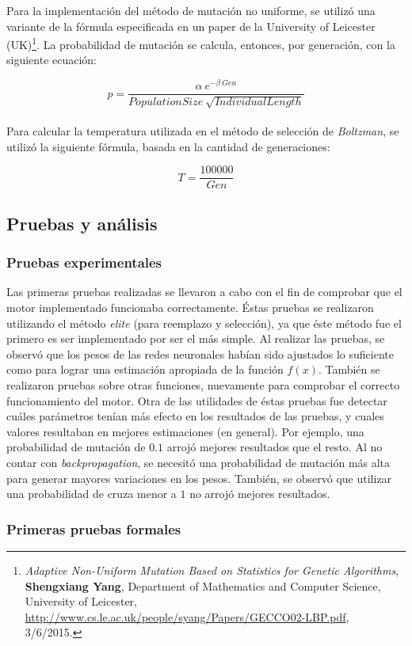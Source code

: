 \documentclass[11pt,a4paper]{article}
\begin{document}
Para la implementación del método de mutación no uniforme, se utilizó una variante de la fórmula especificada en un paper de la University of Leicester (UK)\footnote{\emph{Adaptive Non-Uniform Mutation Based on Statistics for Genetic Algorithms}, \textbf{Shengxiang Yang}, Department of Mathematics and Computer Science, University of Leicester, \url{http://www.cs.le.ac.uk/people/syang/Papers/GECCO02-LBP.pdf}, 3/6/2015.}. La probabilidad de mutación se calcula, entonces, por generación, con la siguiente ecuación:

$$ p = \frac{ \alpha\ e^{-\beta\ Gen}}{PopulationSize\ \sqrt{IndividualLength}} $$
\\
Para calcular la temperatura utilizada en el método de selección de \emph{Boltzman}, se utilizó la siguiente fórmula, basada en la cantidad de generaciones:

$$ T = \frac{100000}{Gen} $$
\subsection{Pruebas y análisis}
\subsubsection{Pruebas experimentales}

Las primeras pruebas realizadas se llevaron a cabo con el fin de comprobar que el motor implementado funcionaba correctamente. Éstas pruebas se realizaron utilizando el método \emph{elite} (para reemplazo y selección), ya que éste método fue el primero es ser implementado por ser el más simple. Al realizar las pruebas, se observó que los pesos de las redes neuronales habían sido ajustados lo suficiente como para lograr una estimación apropiada de la función $f(x).$  También se realizaron pruebas sobre otras funciones, nuevamente para comprobar el correcto funcionamiento del motor.  Otra de las utilidades de éstas pruebas fue detectar cuáles parámetros tenían más efecto en los resultados de las pruebas, y cuales valores resultaban en mejores estimaciones (en general). Por ejemplo, una probabilidad de mutación de $0.1$ arrojó mejores resultados que el resto. Al no contar con \emph{backpropagation}, se necesitó una probabilidad de mutación más alta para generar mayores variaciones en los pesos. También, se observó que utilizar una probabilidad de cruza menor a $1$ no arrojó mejores resultados.

\subsubsection{Primeras pruebas formales}
\end{document}
